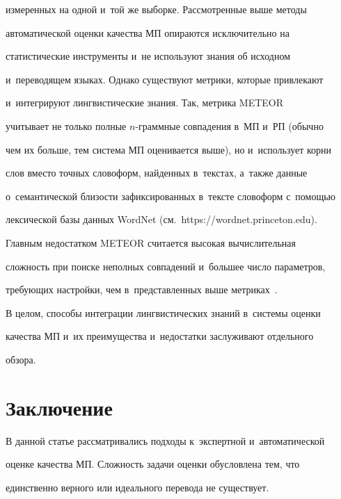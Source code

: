 измеренных на одной и~той же выборке. Рассмотренные выше методы 

автоматической оценки качества МП опираются исключительно на 

статистические инструменты и~не используют знания об исходном 

и~переводящем языках. Однако существуют метрики, которые привлекают 

и~интегрируют лингвистические знания. Так, метрика METEOR~\cite{27-r} 

учитывает не только полные $n$-грам\-мные совпадения в~МП и~РП (обычно 

чем их больше, тем система МП оценивается выше), но и~использует корни 

слов вместо точных словоформ, найденных в~текстах, а~также данные 

о~семантической бли\-зости зафиксированных в~тексте словоформ с~помощью 

лексической базы данных WordNet (см.\ {\sf https://wordnet.princeton.edu}). 

  

  Главным недостатком METEOR считается высокая вычислительная 

сложность при поиске неполных совпадений и~большее число параметров, 

требующих настройки, чем в~представленных выше метриках~\cite{22-r}.

  

  В целом, способы интеграции лингвистических знаний в~системы оценки 

качества МП и~их преимущества и~недостатки заслуживают отдельного 

обзора.




  

  \section{Заключение}

  


  

  В данной статье рассматривались подходы к~экспертной и~автоматической 

оценке качества МП. Сложность задачи оценки обусловлена тем, что 

единственно верного или идеального перевода не существует.

